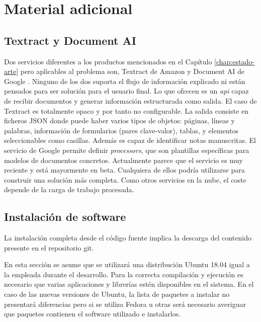 
\chapter{Material adicional}
\label{chap:material-adicional}

\section{Textract y Document AI}

Dos servicios diferentes a los productos mencionados en el Capítulo \ref{chap:estado-arte} pero aplicables al problema son, Textract de Amazon \cite{solucionesComerciales_amazon_textract} y Document AI de Google \cite{solucionesComerciales_google_documentAI}. Ninguno de los dos suporta el flujo de información explicado ni están pensados para ser solución para el usuario final. Lo que ofrecen es un \emph{\acrshort{api}} capaz de recibir documentos y generar información estructurada como salida. El caso de Textract es totalmente opaco y por tanto no configurable. La salida consiste en ficheros JSON donde puede haber varios tipos de objetos: páginas, líneas y palabras, información de formularios (pares clave-valor), tablas, y elementos seleccionables como casillas. Además es capaz de identificar notas manuscritas. El servicio de Google permite definir \emph{processors}, que son plantillas específicas para modelos de documentos concretos. Actualmente parece que el servicio es muy reciente y está mayormente en beta. Cualquiera de ellos podría utilizarse para construir una solución más completa. Como otros servicios en la nube, el coste depende de la carga de trabajo procesada.

\section{Instalación de software}
\label{chap:instalacion-software}

La instalación completa desde el código fuente implica la descarga del contenido presente en el repositorio git.

En esta sección se asume que se utilizará una distribución Ubuntu 18.04 igual a la empleada durante el desarrollo. Para la correcta compilación y ejecución es necesario que varias aplicaciones y librerías estén disponibles en el sistema. En el caso de las nuevas versiones de Ubuntu, la lista de paquetes a instalar no presentará diferencias pero si se utiliza Fedora u otras será necesario averiguar que paquetes contienen el software utilizado e instalarlos.

